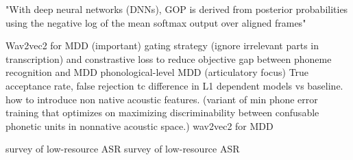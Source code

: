 \documentclass[thesis]{cluu}
\begin{document}
"With deep neural networks (DNNs), GOP is derived from posterior probabilities using the negative log of the mean softmax output over aligned frames" \parencite{parikhEvaluatingLogitBasedGOP2025}

\textcite{pengStudyFineTuningWav2vec202021} Wav2vec2 for MDD (important)
\textcite{pengTextAwareEndtoendMispronunciation2022} gating strategy (ignore irrelevant parts in transcription) and constrastive loss to reduce objective gap between phoneme recognition and MDD
\textcite{shahinPhonologicalLevelMispronunciationDetection2024} phonological-level MDD (articulatory focus) True acceptance rate, false rejection tc
\textcite{stanleyImprovingL1specificPhonological2012} difference in L1 dependent models vs baseline. how to introduce non native acoustic features. (variant of min phone error training that optimizes on maximizing discriminability between confusable phonetic units in nonnative acoustic space.)
\textcite{xuExploreWav2vec202021} wav2vec2 for MDD

\parencite{barteldsMakingMoreLittle2023} survey of low-resource ASR
\parencite{besacierAutomaticSpeechRecognition2014} survey of low-resource ASR
\end{document}
